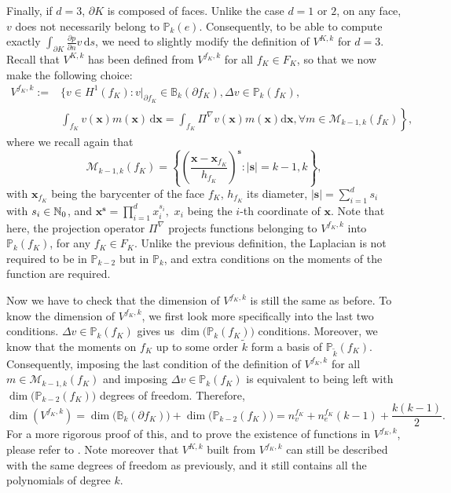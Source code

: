 Finally, if $d=3$, $\partial K$ is composed of faces. Unlike the case $d=1$ or $2$, on any face, $v$ does not necessarily belong to $\mathbb{P}_k(e)$. Consequently, to be able to compute exactly $\int_{\partial K} \frac{\partial p}{\partial n} v \, \mathrm{d}s$, we need to  slightly modify the definition of $V^{K,k}$ for $d=3$. Recall that $V^{K,k}$ has been defined from $V^{f_K,k}$ for all $f_K\in F_K$, so that we now make the following choice:
\begin{align*}
V^{f_K,k} := &\Bigg\{v\in H^1(f_K) : v|_{\partial f_K} \in \mathbb{B}_k(\partial f_K), \Delta v\in \mathbb{P}_{k}(f_K), \\
&\left. \int_{f_K} v(\mathbf{x}) m(\mathbf{x}) \, \mathrm{d}\mathbf{x} = \int_{f_K} \Pi^\nabla v(\mathbf{x}) m(\mathbf{x})\mathrm{d}\mathbf{x}, \forall m\in\mathcal{M}_{k-1,k}(f_K) \right\},
\end{align*}
where we recall again that $$\mathcal{M}_{k-1,k}(f_K) = \left\{\left(\frac{\mathbf{x}- \mathbf{x}_{f_K}}{h_{f_K}}\right)^\mathbf{s} : |\mathbf{s}|= k-1, k\right\},$$ with $\mathbf{x}_{f_K}$ being the barycenter of the face $f_K$, $h_{f_K}$ its diameter, $|\mathbf{s}| = \sum_{i=1}^d s_i$ with $s_i\in \mathbb{N}_0$, and $\mathbf{x}^\mathbf{s}=\prod_{i=1}^d x_i^{s_i},$ $x_i$ being the $i$-th coordinate of $\mathbf{x}$. Note that here, the projection operator $\Pi^\nabla$ projects functions belonging to $V^{f_K,k}$ into $\mathbb{P}_k(f_K)$, for any $f_K\in F_K$. 
Unlike the previous definition, the Laplacian is not required to be in $\mathbb{P}_{k-2}$ but in $\mathbb{P}_k$, and extra conditions on the moments of the function are required.

Now we have to check that the dimension of $V^{f_K,k}$ is still the same as before. 
To know the dimension of $V^{f_K,k}$, we first look more specifically into the last two conditions. $\Delta v\in\mathbb{P}_k(f_K)$ gives us $\dim\big(\mathbb{P}_k(f_K)\big)$ conditions. Moreover, we know that the moments on $f_K$ up to some order $\tilde{k}$ form a basis of $\mathbb{P}_{\tilde{k}}(f_K)$. Consequently, imposing the last condition of the definition of $V^{f_K,k}$ for all $m\in\mathcal{M}_{k-1,k}(f_K)$ and imposing $\Delta v\in\mathbb{P}_k(f_K)$ is equivalent to being left with $\dim\big(\mathbb{P}_{k-2}(f_K)\big)$ degrees of freedom. Therefore, 
$$\dim\left(V^{f_K,k}\right) = \dim\big(\mathbb{B}_k\left(\partial f_K\right)\big)+\dim\big(\mathbb{P}_{k-2}(f_K)\big)= n_v^{f_K} + n_e^{f_K}(k-1) + \frac{k(k-1)}{2}.$$
For a more rigorous proof of this, and to prove the existence of functions in $V^{f_K,k}$, please refer to \cite{existenceW}. Note moreover that $V^{K,k}$ built from $V^{f_K,k}$ can still be described with the same degrees of freedom as previously, and it still contains all the polynomials of degree $k$. 

